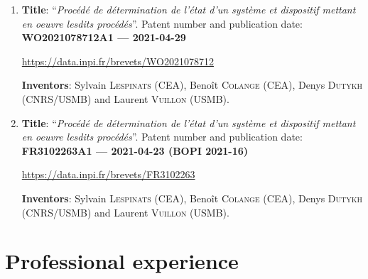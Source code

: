 \documentclass[final, a4paper, oneside, 12pt]{article}
\numberwithin{equation}{section}
\begin{document}
\begin{enumerate}
  
  \item \textbf{Title}: ``\textit{Proc\'ed\'e de d\'etermination de l'\'etat d'un syst\`eme et dispositif mettant en oeuvre lesdits proc\'ed\'es}''. Patent number and publication date: \textbf{WO2021078712A1 --- 2021-04-29}
  
  \url{https://data.inpi.fr/brevets/WO2021078712}
  
  \textbf{Inventors}: Sylvain \textsc{Lespinats} (CEA), Beno\^it \textsc{Colange} (CEA), Denys \textsc{Dutykh} (CNRS/USMB) and Laurent \textsc{Vuillon} (USMB).
  
  
  \item \textbf{Title}: ``\textit{Proc\'ed\'e de d\'etermination de l'\'etat d'un syst\`eme et dispositif mettant en oeuvre lesdits proc\'ed\'es}''. Patent number and publication date: \textbf{FR3102263A1 --- 2021-04-23 (BOPI 2021-16)}
  
  \url{https://data.inpi.fr/brevets/FR3102263}
  
  \textbf{Inventors}: Sylvain \textsc{Lespinats} (CEA), Beno\^it \textsc{Colange} (CEA), Denys \textsc{Dutykh} (CNRS/USMB) and Laurent \textsc{Vuillon} (USMB).

\end{enumerate}


\section{Professional experience}
\end{document}

